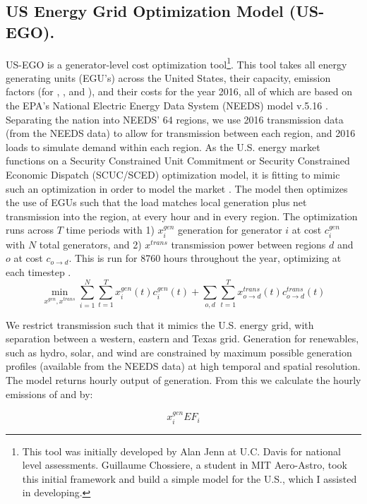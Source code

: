 \documentclass[12]{article}
\begin{document}
\subsection{US Energy Grid Optimization Model (US-EGO).}
US-EGO is a generator-level cost optimization tool\footnote{This tool was initially developed by Alan Jenn at U.C. Davis for national level assessments. Guillaume Chossiere, a student in MIT Aero-Astro, took this initial framework and build a simple model for the U.S., which I assisted in developing.}. This tool takes all energy generating units (EGU's) across the United States, their capacity, emission factors (for , , and ), and their costs for the year 2016, all of which are based on the EPA's National Electric Energy Data System (NEEDS) model v.5.16 \citep{epa_power_2016}. Separating the nation into NEEDS' 64 regions, we use 2016 transmission data (from the NEEDS data) to allow for transmission between each region, and 2016 loads to simulate demand within each region. As the U.S. energy market functions on a Security Constrained Unit Commitment or Security Constrained Economic Dispatch (SCUC/SCED) optimization model, it is fitting to mimic such an optimization in order to model the market \citep{ela_evolution_2014}. The model then optimizes the use of EGUs such that the load matches local generation plus net transmission into the region, at every hour and in every region. The optimization runs across $T$ time periods with 1) $x^{gen}_{i}$ generation for generator $i$ at cost $c^{gen}_{i}$ with $N$ total generators, and 2) $x^{trans}$ transmission power between regions $d$ and $o$ at cost $c_{o\rightarrow{}d}$. This is run for 8760 hours throughout the year, optimizing at each timestep \citep{jenn_future_2018}.
\begin{equation}
    \min\limits_{x^{gen}, x^{trans}}\sum_{i=1}^{N}\sum_{t=1}^{T} x^{gen}_{i}(t) c^{gen}_{i}(t) + \sum_{o,d}\sum_{t=1}^{T} x^{trans}_{o\rightarrow{}d}(t) c^{trans}_{o\rightarrow{}d}(t)
\end{equation}

We restrict transmission such that it mimics the U.S. energy grid, with separation between a western, eastern and Texas grid. Generation for renewables, such as hydro, solar, and wind are constrained by maximum possible generation profiles (available from the NEEDS data) at high temporal and spatial resolution. 
The model returns hourly output of generation. From this we calculate the hourly emissions of  and  by:

\begin{equation}
    x^{gen}_{i}EF_i
\end{equation}
\end{document}
